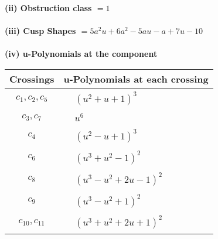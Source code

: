 \documentclass[1p]{elsarticle_modified}
\theoremstyle{definition}
\begin{document}
\flushleft \textbf{(ii) Obstruction class $= 1$}\\~\\
\flushleft \textbf{(iii) Cusp Shapes $= 5 a^2 u+6 a^2-5 a u- a+7 u-10$}\\~\\
\newpage\renewcommand{\arraystretch}{1}
\flushleft \textbf{(iv) u-Polynomials at the component}\newline \\
\begin{tabular}{m{50pt}|m{274pt}}
Crossings & \hspace{64pt}u-Polynomials at each crossing \\
\hline $$\begin{aligned}c_{1},c_{2},c_{5}\end{aligned}$$&$\begin{aligned}
&(u^2+u+1)^3
\end{aligned}$\\
\hline $$\begin{aligned}c_{3},c_{7}\end{aligned}$$&$\begin{aligned}
&u^6
\end{aligned}$\\
\hline $$\begin{aligned}c_{4}\end{aligned}$$&$\begin{aligned}
&(u^2- u+1)^3
\end{aligned}$\\
\hline $$\begin{aligned}c_{6}\end{aligned}$$&$\begin{aligned}
&(u^3+u^2-1)^2
\end{aligned}$\\
\hline $$\begin{aligned}c_{8}\end{aligned}$$&$\begin{aligned}
&(u^3- u^2+2 u-1)^2
\end{aligned}$\\
\hline $$\begin{aligned}c_{9}\end{aligned}$$&$\begin{aligned}
&(u^3- u^2+1)^2
\end{aligned}$\\
\hline $$\begin{aligned}c_{10},c_{11}\end{aligned}$$&$\begin{aligned}
&(u^3+u^2+2 u+1)^2
\end{aligned}$\\
\hline
\end{tabular}\\~\\
\end{document}

